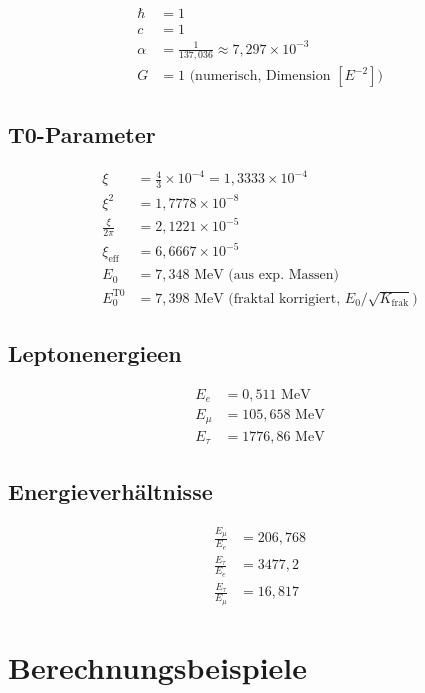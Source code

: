 	\begin{align}
		\hbar &= 1 \\
		c &= 1 \\
		\alpha &= \frac{1}{137{,}036} \approx 7{,}297 \times 10^{-3} \\
		G &= 1 \text{ (numerisch, Dimension } [E^{-2}]\text{)}
	\end{align}
	
	\subsection{T0-Parameter}
	
	\begin{align}
		\xi &= \frac{4}{3} \times 10^{-4} = 1{,}3333 \times 10^{-4} \\
		\xi^2 &= 1{,}7778 \times 10^{-8} \\
		\frac{\xi}{2\pi} &= 2{,}1221 \times 10^{-5} \\
		\xi_{\text{eff}} &= 6{,}6667 \times 10^{-5} \\
		E_0 &= 7{,}348 \text{ MeV (aus exp. Massen)} \\
		E_0^{\text{T0}} &= 7{,}398 \text{ MeV (fraktal korrigiert, } E_0/\sqrt{K_{\text{frak}}}\text{)}
	\end{align}
	
	\subsection{Leptonenergieen}
	
	\begin{align}
		E_e &= 0{,}511 \text{ MeV} \\
		E_\mu &= 105{,}658 \text{ MeV} \\
		E_\tau &= 1776{,}86 \text{ MeV}
	\end{align}
	
	\subsection{Energieverhältnisse}
	
	\begin{align}
		\frac{E_\mu}{E_e} &= 206{,}768 \\
		\frac{E_\tau}{E_e} &= 3477{,}2 \\
		\frac{E_\tau}{E_\mu} &= 16{,}817
	\end{align}
	
	\section{Berechnungsbeispiele}
	\label{sec:calculations}
	
